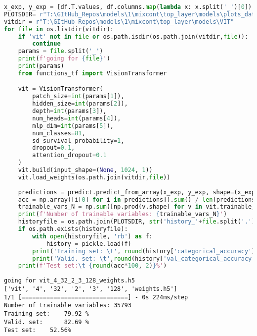 \begin{lstlisting}[language=Python]
x_exp, y_exp = [df.T.values, df.columns.map(lambda x: x.split('_')[0]).values] # top layer
PLOTSDIR= r"T:\GItHub_Repos\models\1\mixcont\top_layer\models\plots_data"
vitdir = r"T:\GItHub_Repos\models\1\mixcont\top_layer\models\VIT"
for file in os.listdir(vitdir):
    if 'vit' not in file or os.path.isdir(os.path.join(vitdir,file)):
        continue
    params = file.split('_')
    print(f'going for {file}')
    print(params)
    from functions_tf import VisionTransformer

    vit = VisionTransformer(
        patch_size=int(params[1]),
        hidden_size=int(params[2]),
        depth=int(params[3]),
        num_heads=int(params[4]),
        mlp_dim=int(params[5]),
        num_classes=81,
        sd_survival_probability=1,
        dropout=0.1,
        attention_dropout=0.1
    )
    vit.build(input_shape=(None, 1024, 1))
    vit.load_weights(os.path.join(vitdir,file))
    
    predictions = predict.predict_from_array(x_exp, y_exp, shape=(x_exp.shape[0], 1024,1), model=vit)
    acc = np.array([i[0] for i in predictions]).sum() / len(predictions)
    trainable_vars_N = np.sum([np.prod(v.shape) for v in vit.trainable_variables])
    print(f'Number of trainable variables: {trainable_vars_N}')
    historyfile = os.path.join(PLOTSDIR, str('history_'+file.split('.')[0][:-8]+'.pkl'))
    if os.path.exists(historyfile):
        with open(historyfile, 'rb') as f:
            history = pickle.load(f)
        print('Training set: \t', round(history['categorical_accuracy'][-1]*100, 2), '%')
        print('Valid. set: \t',round(history['val_categorical_accuracy'][-1]*100, 2), '%')
    print(f'Test set:\t {round(acc*100, 2)}%')
\end{lstlisting}

\begin{lstlisting}
going for vit_4_32_2_3_128_weights.h5
['vit', '4', '32', '2', '3', '128', 'weights.h5']
1/1 [==============================] - 0s 224ms/step
Number of trainable variables: 35793
Training set: 	 79.92 %
Valid. set: 	 82.69 %
Test set:	 52.56%
\end{lstlisting}
